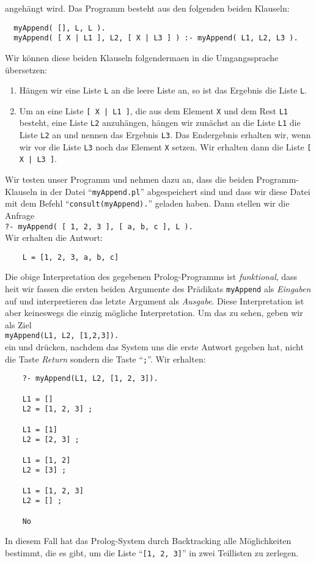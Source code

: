 angeh\"{a}ngt wird.  Das Programm besteht aus den folgenden beiden Klauseln:
\begin{verbatim}
  myAppend( [], L, L ).
  myAppend( [ X | L1 ], L2, [ X | L3 ] ) :- myAppend( L1, L2, L3 ).
\end{verbatim}
Wir k\"{o}nnen diese beiden Klauseln folgenderma\3en in die Umgangssprache \"{u}bersetzen:
\begin{enumerate}
\item H\"{a}ngen wir eine Liste \texttt{L} an die leere Liste an, so ist das Ergebnis die
      Liste \texttt{L}.
\item Um an eine Liste \texttt{[ X | L1 ]}, die aus dem Element \texttt{X} und dem Rest \texttt{L1} besteht,
      eine Liste \texttt{L2} anzuh\"{a}ngen, h\"{a}ngen wir zun\"{a}chst an die Liste \texttt{L1} die 
      Liste \texttt{L2} an und nennen das Ergebnis \texttt{L3}.  
      Das Endergebnis erhalten wir, wenn wir vor die Liste \texttt{L3} noch das Element \texttt{X}
      setzen.  Wir erhalten dann die Liste \texttt{[ X | L3 ]}.
\end{enumerate}
Wir testen unser Programm und nehmen dazu an, dass die beiden Programm-Klauseln in der Datei
``\texttt{myAppend.pl}'' abgespeichert sind und dass wir diese Datei mit dem Befehl ``\texttt{consult(myAppend).}'' geladen haben.
Dann stellen wir die Anfrage \\[0.2cm]
\hspace*{1.3cm} \texttt{?- myAppend( [ 1, 2, 3 ], [ a, b, c ], L ).} \\[0.2cm]
Wir erhalten die Antwort:
\begin{verbatim}
    L = [1, 2, 3, a, b, c] 
\end{verbatim}
Die obige Interpretation des gegebenen Prolog-Programms ist \emph{funktional}, dass hei\3t 
wir fassen die ersten beiden Argumente des Pr\"{a}dikats \texttt{myAppend} als \emph{Eingaben} auf und 
interpretieren das letzte Argument als \emph{Ausgabe}.  Diese Interpretation ist aber keineswegs die 
einzig m\"{o}gliche Interpretation.  Um das zu sehen, geben wir als Ziel \\[0.2cm]
\hspace*{1.3cm} \texttt{myAppend(L1, L2, [1,2,3]).} \\[0.2cm]
ein und dr\"{u}cken, nachdem das System uns die erste Antwort gegeben hat, nicht die Taste 
\textsl{Return} sondern die Taste ``\texttt{;}''.  Wir erhalten:
\begin{verbatim}
    ?- myAppend(L1, L2, [1, 2, 3]).

    L1 = []
    L2 = [1, 2, 3] ;

    L1 = [1]
    L2 = [2, 3] ;

    L1 = [1, 2]
    L2 = [3] ;

    L1 = [1, 2, 3]
    L2 = [] ;

    No
\end{verbatim}
In diesem Fall hat das Prolog-System durch Backtracking  alle M\"{o}glichkeiten bestimmt, die
es gibt, um die Liste ``\texttt{[1, 2, 3]}'' in zwei Teillisten zu zerlegen.

